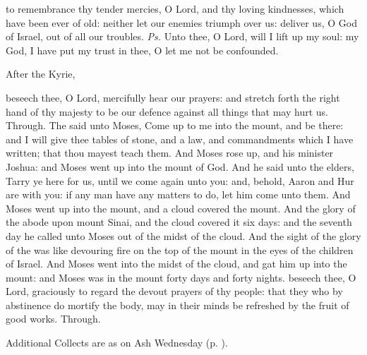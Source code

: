 \introit
{} to remembrance thy tender mercies, O Lord, and thy loving kindnesses, which have been ever of old: neither let our enemies triumph over us: deliver us, O God of Israel, out of all our troubles. \textit{Ps.} Unto thee, O Lord, will I lift up my soul: my God, I have put my trust in thee, O let me not be confounded.
\begin{rubric}
    After the Kyrie,
\end{rubric}
\collect
{} beseech thee, O Lord, mercifully hear our prayers: and stretch forth the right hand of thy majesty to be our defence against all things that may hurt us. Through.
 The  said unto Moses, Come up to me into the mount, and be there: and I will give thee tables of stone, and a law, and commandments which I have written; that thou mayest teach them. And Moses rose up, and his minister Joshua: and Moses went up into the mount of God. And he said unto the elders, Tarry ye here for us, until we come again unto you: and, behold, Aaron and Hur are with you: if any man have any matters to do, let him come unto them. And Moses went up into the mount, and a cloud covered the mount. And the glory of the  abode upon mount Sinai, and the cloud covered it six days: and the seventh day he called unto Moses out of the midst of the cloud. And the sight of the glory of the  was like devouring fire on the top of the mount in the eyes of the children of Israel. And Moses went into the midst of the cloud, and gat him up into the mount: and Moses was in the mount forty days and forty nights.
{} beseech thee, O Lord, graciously to regard the devout prayers of thy people: that they who by abstinence do mortify the body, may in their minds be refreshed by the fruit of good works. Through.
\begin{rubric}
    Additional Collects are as on Ash Wednesday (p. \pageref{AshWednesdayMass}).
\end{rubric}
